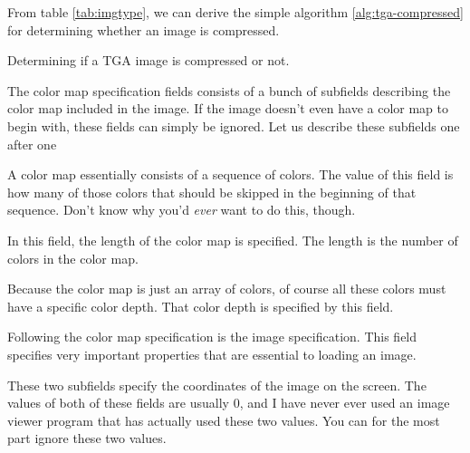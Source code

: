   From table \ref{tab:imgtype}, we can derive the simple algorithm
  \ref{alg:tga-compressed} for determining whether an image is
  compressed.

  \begin{algorithm}[H]
    \caption{Determining if a TGA image is compressed or not.}
    \label{alg:tga-compressed}
    \begin{algorithmic}[1]
    \end{algorithmic}
  \end{algorithm}


  The color map specification fields consists of a bunch of subfields
  describing the color map included in the image. If the image
  doesn't even have a color map to begin with, these fields can simply
  be ignored. Let us describe these subfields one after one


  A color map essentially consists of a sequence of colors. The value
  of this field is how many of those colors that should be skipped in
  the beginning of that sequence. Don't know why you'd \textit{ever}
  want to do this, though.


  In this field, the length of the color map is specified. The
  length is the number of colors in the color map.


  Because the color map is just an array of colors, of course all
  these colors must have a specific color depth. That color depth is
  specified by this field.


  Following the color map specification is the image
  specification. This field specifies very important properties that
  are essential to loading an image.



  These two subfields specify the coordinates of the image on the
  screen. The values of both of these fields are usually $0$, and I
  have never ever used an image viewer program that has actually used
  these two values. You can for the most part ignore these two values.

